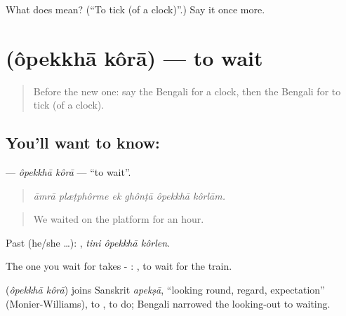 \begin{tcolorbox}[breakable,colback=teal!4,colframe=teal!35!black,title={Before you move on}]
What does   mean? (\textquotedblleft{}To tick (of a clock)\textquotedblright{}.) Say it once more.
\end{tcolorbox}
\section[\texorpdfstring{\bn{অপেক্ষা} \bn{করা} (ôpekkhā kôrā)}{অপেক্ষা করা (ôpekkhā kôrā)}]{  (ôpekkhā kôrā) — to wait}

\label{lesson:BN-C385-opekkha-kora}



\begin{quote}
Before the new one: say the Bengali for a clock, then the Bengali for to tick (of a clock).
\end{quote}

\subsection*{You'll want to know:  }
\textbf{ } — \emph{ôpekkhā kôrā} — \textquotedblleft{}to wait\textquotedblright{}.

\begin{quote}
     
\end{quote}

\begin{quote}
\emph{āmrā plæṭphôrme ek ghônṭā ôpekkhā kôrlām.}
\end{quote}

\begin{quote}
We waited on the platform for an hour.
\end{quote}

Past (he/she …):   , \emph{tini ôpekkhā kôrlen}.

The one you wait for takes - :    , to wait for the train.

\begin{cousinweb}
\textbf{ } (\emph{ôpekkhā kôrā}) joins Sanskrit \emph{apekṣā}, \textquotedblleft{}looking round, regard, expectation\textquotedblright{} (Monier-Williams), to , to do; Bengali narrowed the looking-out to waiting.
\end{cousinweb}

